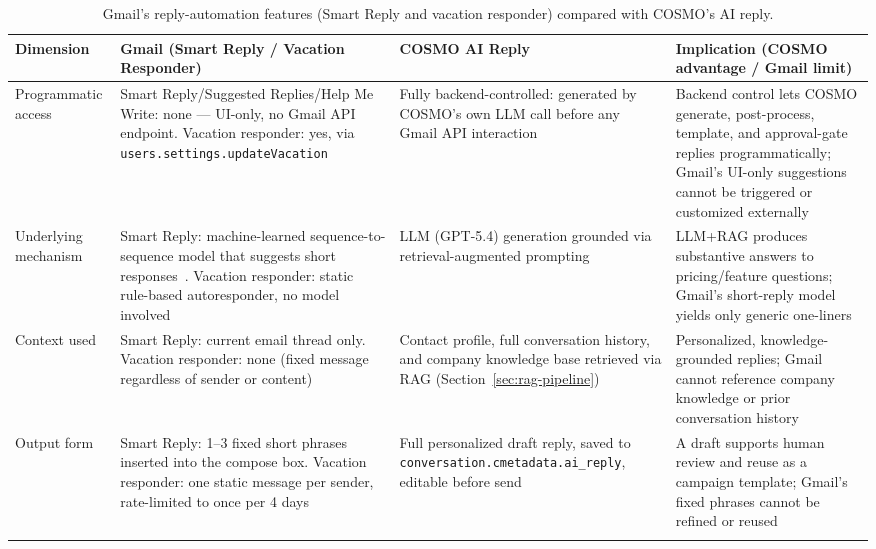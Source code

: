 \documentclass[a4paper]{article}
\renewcommand{\arraystretch}{1.5} %
\begin{document}
\begin{table}[h]
\centering
\caption{Gmail's reply-automation features (Smart Reply and vacation responder) compared with COSMO's AI reply.}
\label{tab:ai-reply-vs-gmail}
\footnotesize
\setlength{\tabcolsep}{4pt}
\renewcommand{\arraystretch}{1.15}
\begin{tabularx}{\textwidth}{
  >{\raggedright\arraybackslash}p{1.9cm}
  >{\raggedright\arraybackslash}X
  >{\raggedright\arraybackslash}X
  >{\raggedright\arraybackslash}X}
\toprule
\textbf{Dimension} & \textbf{Gmail (Smart Reply / Vacation Responder)} & \textbf{COSMO AI Reply} & \textbf{Implication (COSMO advantage / Gmail limit)} \\
\midrule
Programmatic access &
Smart Reply/Suggested Replies/Help Me Write: none --- UI-only, no Gmail API endpoint. Vacation responder: yes, via \texttt{users.\allowbreak settings.\allowbreak updateVacation} &
Fully backend-controlled: generated by COSMO's own LLM call before any Gmail API interaction &
Backend control lets COSMO generate, post-process, template, and approval-gate replies programmatically; Gmail's UI-only suggestions cannot be triggered or customized externally \\
\addlinespace
Underlying mechanism &
Smart Reply: machine-learned sequence-to-sequence model that suggests short responses~\cite{kannan2016smartreply}. Vacation responder: static rule-based autoresponder, no model involved &
LLM (GPT-5.4) generation grounded via retrieval-augmented prompting &
LLM+RAG produces substantive answers to pricing/feature questions; Gmail's short-reply model yields only generic one-liners \\
\addlinespace
Context used &
Smart Reply: current email thread only. Vacation responder: none (fixed message regardless of sender or content) &
Contact profile, full conversation history, and company knowledge base retrieved via RAG (Section~\ref{sec:rag-pipeline}) &
Personalized, knowledge-grounded replies; Gmail cannot reference company knowledge or prior conversation history \\
\addlinespace
Output form &
Smart Reply: 1--3 fixed short phrases inserted into the compose box. Vacation responder: one static message per sender, rate-limited to once per 4 days &
Full personalized draft reply, saved to \texttt{conversation.\allowbreak cmetadata.\allowbreak ai\_reply}, editable before send &
A draft supports human review and reuse as a campaign template; Gmail's fixed phrases cannot be refined or reused \\
\addlinespace

\end{tabularx}
\end{table}
\end{document}
